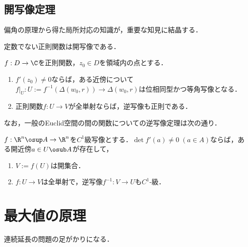 \documentclass[uplatex, dvipdfmx]{jsreport}
\begin{document}
\subsection{開写像定理}

\begin{tcolorbox}[colframe=ForestGreen, colback=ForestGreen!10!white,breakable,colbacktitle=ForestGreen!40!white,coltitle=black,fonttitle=\bfseries\sffamily,
title=]
    偏角の原理から得た局所対応の知識が，重要な知見に結晶する．
\end{tcolorbox}

\begin{corollary}
    定数でない正則関数は開写像である．
\end{corollary}

\begin{corollary}
    $f:D\to \C$を正則関数，$z_0\in D$を領域内の点とする．
    \begin{enumerate}
        \item $f'(z_0)\ne0$ならば，ある近傍について$f|_{U}:U:=f^{-1}(\Delta(w_0,r))\to \Delta(w_0,r)$は位相同型かつ等角写像となる．
        \item 正則関数$f:U\to V$が全単射ならば，逆写像も正則である．
    \end{enumerate}
\end{corollary}

なお，一般のEuclid空間の間の関数についての逆写像定理は次の通り．

\begin{theorem}\label{thm-inverse-mapping-between-Euclid-spaces}
    $f:\R^n\osup A\to\R^n$を$C^1$級写像とする．$\det f'(a)\ne 0\;(a\in A)$ならば，ある開近傍$a\in U\osub A$が存在して，
    \begin{enumerate}
        \item $V:=f(U)$は開集合．
        \item $f:U\to V$は全単射で，逆写像$f^{-1}:V\to U$も$C^1$-級．
    \end{enumerate}
\end{theorem}

\section{最大値の原理}

\begin{tcolorbox}[colframe=ForestGreen, colback=ForestGreen!10!white,breakable,colbacktitle=ForestGreen!40!white,coltitle=black,fonttitle=\bfseries\sffamily,
title=]
    連続延長の問題の足がかりになる．
\end{tcolorbox}
\end{document}
